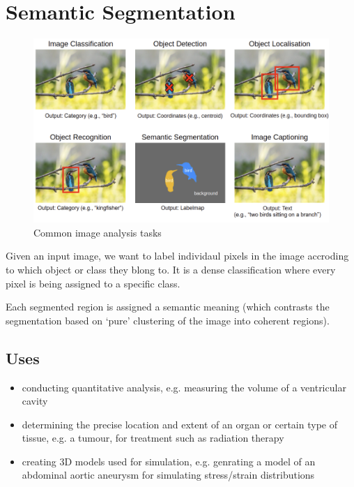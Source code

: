 \documentclass[11pt]{article}
\begin{document}


\tableofcontents

\clearpage

\section{Semantic Segmentation}

\begin{figure}[H]
    \centering
    \includegraphics[width=.9\linewidth]{figures/common-image-analysis-tasks.png}
    \caption{Common image analysis tasks}
\end{figure}

\begin{definition}
    Given an input image, we want to label individaul pixels in the image accroding to which object or class they blong to. It is a dense classification where every pixel is being assigned to a specific class.

    Each segmented region is assigned a semantic meaning (which contrasts the segmentation based on `pure' clustering of the image into coherent regions).
\end{definition}

\subsection{Uses}

\begin{itemize}
    \item conducting quantitative analysis, e.g. measuring the volume of a ventricular cavity
    \item determining the precise location and extent of an organ or certain type of tissue, e.g. a tumour, for treatment such as radiation therapy
    \item creating 3D models used for simulation, e.g. genrating a model of an abdominal aortic aneurysm for simulating stress/strain distributions
\end{itemize}
\end{document}
